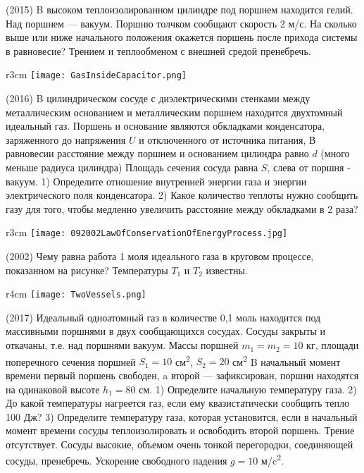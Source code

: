 \AddProb (2015) B высоком теплоизолированном цилиндре под поршнем находится гелий. Над поршнем — вакуум. Поршню толчком сообщают скорость 2 м/с. На сколько выше или ниже начального положения окажется поршень после прихода системы в равновесие? Трением и теплообменом с внешней средой пренебречь.

\begin{wrapfigure}{r}{3cm}
\texttt{[image: GasInsideCapacitor.png]}
\end{wrapfigure}
\AddProb (2016) B цилиндрическом сосуде с диэлектрическими стенками между металлическим основанием и металлическим поршнем находится двухтомный идеальный газ. Поршень и основание являются обкладками конденсатора, заряженного до напряжения $U$ и отключенного от источника питания, В равновесии расстояние между поршнем и основанием цилиндра равно $d$ (много меньше радиуса цилиндра) Площадь сечения сосуда равна $S$, слева от поршня - вакуум.
1) Определите отношение внутренней энергии газа и энергии электрического поля конденсатора. 2) Какое количество теплоты нужно сообщить газу для того, чтобы медленно увеличить расстояние между обкладками в 2 раза?


\begin{wrapfigure}{r}{3cm}
\texttt{[image: 092002LawOfConservationOfEnergyProcess.jpg]}
\end{wrapfigure}
\AddProb (2002) Чему равна работа 1 моля идеального газа в круговом процессе, показанном на рисунке? Температуры $T_1$ и $T_2$ известны.

\begin{wrapfigure}{r}{4cm}
\texttt{[image: TwoVessels.png]}
\end{wrapfigure}
\AddProb (2017) Идеальный одноатомный газ в количестве 0,1 моль находится под массивными поршнями в двух сообщающихся сосудах. Сосуды закрыты и откачаны, т.е. над поршнями вакуум. Массы поршней $m_1 = m_2 = 10$ кг, площади поперечного сечения поршней $S_1 = 10$ см\textsuperscript{2}, $S_2 = 20$ см\textsuperscript{2} B начальный момент времени первый поршень свободен, a второй — зафиксирован, поршни находятся на одинаковой высоте $h_1 = 80$ см. 1) Определите начальную температуру газа. 2) До какой температуры нагреется газ, если ему квазистатически сообщить тепло 100 Дж? 3) Определите температуру газа, которая установится, если в начальный момент времени сосуды теплоизолировать и освободить второй поршень. Трение отсутствует. Сосуды высокие, объемом очень тонкой перегородки, соединяющей сосуды, пренебречь. Ускорение свободного падения $g = 10$ м/c\textsuperscript{2}.


